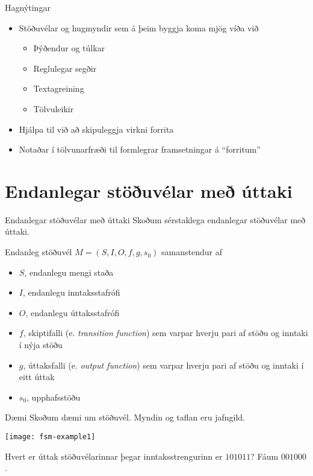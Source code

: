 \documentclass{beamer}
\begin{document}
\begin{frame}{Hagnýtingar}
\begin{itemize}
 \item Stöðuvélar og hugmyndir sem á þeim byggja koma mjög víða við
  \begin{itemize}
  \item Þýðendur og túlkar
  \item Reglulegar segðir
  \item Textagreining
  \item Tölvuleikir
 \end{itemize}
 \item Hjálpa til við að skipuleggja virkni forrita
 \item Notaðar í tölvunarfræði til formlegrar framsetningar á ``forritum''
\end{itemize}

\end{frame}


\section{Endanlegar stöðuvélar með úttaki}

\begin{frame}{Endanlegar stöðuvélar með úttaki}
Skoðum sérstaklega endanlegar stöðuvélar með úttaki.

\begin{tcolorbox}
Endanleg stöðuvél $M = (S, I, O, f, g, s_0 )$ samanstendur af
\begin{itemize}
 \item $S$, endanlegu mengi staða
 \item $I$, endanlegu inntaksstafrófi
 \item $O$, endanlegu úttaksstafrófi
 \item $f$, skiptifalli (e. \emph{transition function}) sem varpar hverju pari af stöðu og inntaki í nýja stöðu
 \item $g$, úttaksfalli (e. \emph{output function}) sem varpar hverju pari af stöðu og inntaki í eitt úttak
 \item $s_0$, upphafsstöðu
\end{itemize}

\end{tcolorbox}
\end{frame}

\begin{frame}{Dæmi}
Skoðum dæmi um stöðuvél. Myndin og taflan eru jafngild.
\begin{center}
\texttt{[image: fsm-example1]}
\end{center}
Hvert er úttak stöðuvélarinnar þegar inntaksstrengurinn er $101011$? \pause Fáum $001000$.
\end{frame}
\end{document}
